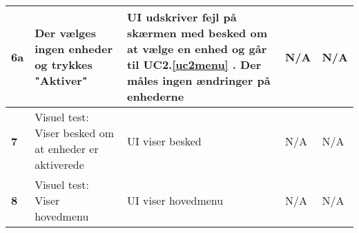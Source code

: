 \begin{center}
\begin{longtable}{|p{}|p{}|p{}|p{}|p{}|}
\textbf{6a}			&Der vælges ingen enheder og trykkes "Aktiver"				
					&UI udskriver fejl på skærmen med besked om at vælge en enhed og går til UC2.\ref{uc2menu}	. 
					 Der måles ingen ændringer på enhederne
					&N/A 
					&N/A \\\hline
		
\textbf{7}			&Visuel test: Viser besked om at enheder er aktiverede
					&UI viser besked
					&N/A
					&N/A \\\hline
					
\textbf{8}			&Visuel test: Viser hovedmenu
					&UI viser hovedmenu
					&N/A
					&N/A \\\hline

															
	\end{longtable}
	\label{ATUC2} 
\end{center}